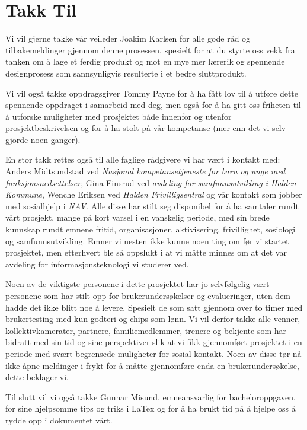 \cleardoublepage
\chapter*{Takk Til}
Vi vil gjerne takke vår veileder Joakim Karlsen for alle gode råd og tilbakemeldinger gjennom denne prosessen, spesielt for at du styrte oss vekk fra tanken om å lage et ferdig produkt og mot en mye mer lærerik og spennende designprosess som sannsynligvis resulterte i et bedre sluttprodukt.

Vi vil også takke oppdragsgiver Tommy Payne for å ha fått lov til å utføre dette spennende oppdraget i samarbeid med deg, men også for å ha gitt oss friheten til å utforske muligheter med prosjektet både innenfor og utenfor prosjektbeskrivelsen og for å ha stolt på vår kompetanse (mer enn det vi selv gjorde noen ganger).

En stor takk rettes også til alle faglige rådgivere vi har vært i kontakt med: Anders Midtsundstad ved {\em Nasjonal kompetansetjeneste for barn og unge med funksjonsnedsettelser}, Gina Finsrud ved {\em avdeling for samfunnsutvikling i Halden Kommune}, Wenche Eriksen ved {\em Halden Frivilligsentral} og vår kontakt som jobber med sosialhjelp i {\em NAV}. Alle disse har stilt seg disponibel for å ha samtaler rundt vårt prosjekt, mange på kort varsel i en vanskelig periode, med sin brede kunnskap rundt emnene fritid, organisasjoner, aktivisering, frivillighet, sosiologi og samfunnsutvikling. Emner vi nesten ikke kunne noen ting om før vi startet prosjektet, men etterhvert ble så oppslukt i at vi måtte minnes om at det var avdeling for informasjonsteknologi vi studerer ved.

Noen av de viktigste personene i dette prosjektet har jo selvfølgelig vært personene som har stilt opp for brukerundersøkelser og evalueringer, uten dem hadde det ikke blitt noe å levere. Spesielt de som satt gjennom over to timer med brukertesting med kun godteri og chips som lønn. Vi vil derfor takke alle venner, kollektivkamerater, partnere, familiemedlemmer, trenere og bekjente som har bidratt med sin tid og sine perspektiver slik at vi fikk gjennomført prosjektet i en periode med svært begrensede muligheter for sosial kontakt. Noen av disse tør nå ikke åpne meldinger i frykt for å måtte gjennomføre enda en brukerundersøkelse, dette beklager vi.

Til slutt vil vi også takke Gunnar Misund, emneansvarlig for bacheloroppgaven, for sine hjelpsomme tips og triks i LaTex og for å ha brukt tid på å hjelpe oss å rydde opp i dokumentet vårt.
